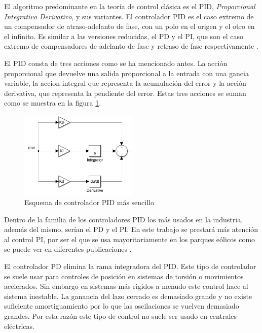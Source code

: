 \documentclass{book}
\begin{document}
El algoritmo predominante en la teor\'ia de control cl\'asica es el PID, \emph{Proporcional Integrativo Derivativo}, y sus variantes. El controlador PID es el caso extremo de un compensador de atraso-adelanto de fase, con un polo en el origen y el otro en el infinito. Es similar a las versiones reducidas, el PD y el PI, que son el caso extremo de compensadores de adelanto de fase y retraso de fase respectivamente \cite{PIDanalysis}. \par

El PID consta de tres acciones como se ha mencionado antes. La acci\'on proporcional que devuelve una salida proporcional a la entrada con una gancia variable, la accion integral que representa la acumulaci\'on del error y la acci\'on derivativa, que representa la pendiente del error. Estas tres acciones se suman como se muestra en la figura \ref{EsquemaPID}. \par


\begin{figure}[h!]
\centering
\includegraphics[width=0.5\textwidth]{EsquemaPID.PNG}
\caption{Esquema de controlador PID m\'as sencillo}
\label{EsquemaPID}
\end{figure}\par

Dentro de la familia de los controladores PID los m\'as usados en la industria, adem\'as del mismo, ser\'ian el PD y el PI. En este trabajo se prestar\'a m\'as atenci\'on al control PI, por ser el que se usa mayoritariamente en los parques e\'olicos como se puede ver en diferentes publicaciones \cite{WindFarmController, PI_QV, SPControl, ExamplePI, ExamplePI1}. \par

El controlador PD elimina la rama integradora del PID. Este tipo de controlador se suele usar para controles de posici\'on en sistemas de torsi\'on o movimientos acelerados. Sin embargo en sistemas m\'as rigidos a menudo este control hace al sistema inestable. La ganancia del lazo cerrado es demasiado grande y no existe suficiente amortiguamiento por lo que las oscilaciones se vuelven demasiado grandes\cite{PDanalysis}. Por esta raz\'on este tipo de control no suele ser usado en centrales el\'ectricas. \par
\end{document}
